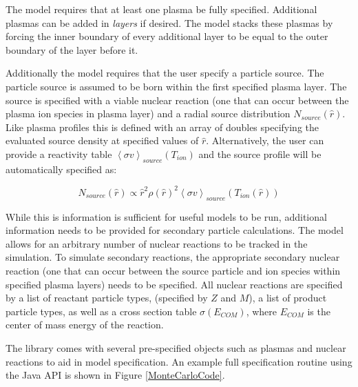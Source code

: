 	The model requires that at least one plasma be fully specified. Additional plasmas can be added in \emph{layers} if desired. The model stacks these plasmas by forcing the inner boundary of every additional layer to be equal to the outer boundary of the layer before it. 
	
	Additionally the model requires that the user specify a particle source. The particle source is assumed to be born within the first specified plasma layer. The source is specified with a viable nuclear reaction (one that can occur between the plasma ion species in plasma layer) and a radial source distribution $N_{source}(\hat{r})$. Like plasma profiles this is defined with an array of doubles specifying the evaluated source density at specified values of $\hat{r}$. Alternatively, the user can provide a reactivity table $\left<\sigma v\right>_{source}(T_{ion})$ and the source profile will be automatically specified as:
	
	\begin{equation}
		N_{source}(\hat{r}) \propto \hat{r}^2 \rho(\hat{r})^2 \left<\sigma v\right>_{source}(T_{ion}(\hat{r}))
		\label{eq:burnDist}
	\end{equation}
	
	While this is information is sufficient for useful models to be run, additional information needs to be provided for secondary particle calculations. The model allows for an arbitrary number of nuclear reactions to be tracked in the simulation. To simulate secondary reactions, the appropriate secondary nuclear reaction (one that can occur between the source particle and ion species within specified plasma layers) needs to be specified. All nuclear reactions are specified by a list of reactant particle types, (specified by $Z$ and $M$), a list of product particle types, as well as a cross section table $\sigma(E_{COM})$, where $E_{COM}$ is the center of mass energy of the reaction. 
	
	The library comes with several pre-specified objects such as plasmas and nuclear reactions to aid in model specification. An example full specification routine using the Java API is shown in Figure \ref{MonteCarloCode}.
	

